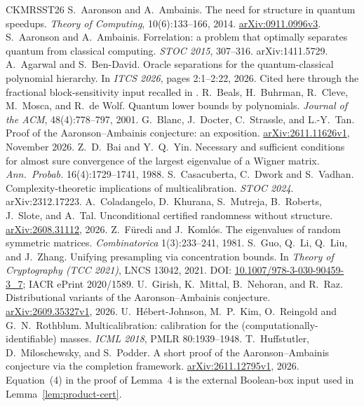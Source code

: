 \documentclass[11pt]{article}
\theoremstyle{definition}\newtheorem{definition}[theorem]{Definition}
\theoremstyle{remark}\newtheorem{remark}[theorem]{Remark}
\begin{document}
\begin{thebibliography}{CKMRSST26}
 S.~Aaronson and A.~Ambainis. The need for structure in quantum speedups. \emph{Theory of Computing}, 10(6):133--166, 2014. \href{https://arxiv.org/abs/0911.0996v3}{arXiv:0911.0996v3}.
 S.~Aaronson and A.~Ambainis. Forrelation: a problem that optimally separates quantum from classical computing. \emph{STOC 2015}, 307--316. arXiv:1411.5729.
 A.~Agarwal and S.~Ben-David. Oracle separations for the quantum-classical polynomial hierarchy. In \emph{ITCS 2026}, pages 2:1--2:22, 2026. Cited here through the fractional block-sensitivity input recalled in \cite[Fact~2.4]{BDST26}.
 R.~Beals, H.~Buhrman, R.~Cleve, M.~Mosca, and R.~de Wolf. Quantum lower bounds by polynomials. \emph{Journal of the ACM}, 48(4):778--797, 2001.
 G.~Blanc, J.~Docter, C.~Strassle, and L.-Y.~Tan. Proof of the Aaronson--Ambainis conjecture: an exposition. \href{https://arxiv.org/abs/2611.11626v1}{arXiv:2611.11626v1}, November 2026.
 Z.~D.~Bai and Y.~Q.~Yin. Necessary and sufficient conditions for almost sure convergence of the largest eigenvalue of a Wigner matrix. \emph{Ann.\ Probab.} 16(4):1729--1741, 1988.
 S.~Casacuberta, C.~Dwork and S.~Vadhan. Complexity-theoretic implications of multicalibration. \emph{STOC 2024}. arXiv:2312.17223.
 A.~Coladangelo, D.~Khurana, S.~Mutreja, B.~Roberts, J.~Slote, and A.~Tal. Unconditional certified randomness without structure. \href{https://arxiv.org/abs/2608.31112}{arXiv:2608.31112}, 2026.
 Z.~Füredi and J.~Komlós. The eigenvalues of random symmetric matrices. \emph{Combinatorica} 1(3):233--241, 1981.
 S.~Guo, Q.~Li, Q.~Liu, and J.~Zhang. Unifying presampling via concentration bounds. In \emph{Theory of Cryptography (TCC 2021)}, LNCS 13042, 2021. DOI: \href{https://doi.org/10.1007/978-3-030-90459-3_7}{10.1007/978-3-030-90459-3\_7}; IACR ePrint 2020/1589.
 U.~Girish, K.~Mittal, B.~Nehoran, and R.~Raz. Distributional variants of the Aaronson--Ambainis conjecture. \href{https://arxiv.org/abs/2609.35327v1}{arXiv:2609.35327v1}, 2026.
 U.~Hébert-Johnson, M.~P.~Kim, O.~Reingold and G.~N.~Rothblum. Multicalibration: calibration for the (computationally-identifiable) masses. \emph{ICML 2018}, PMLR 80:1939--1948.
 T.~Huffstutler, D.~Miloschewsky, and S.~Podder. A short proof of the Aaronson--Ambainis conjecture via the completion framework. \href{https://arxiv.org/abs/2611.12795v1}{arXiv:2611.12795v1}, 2026. Equation~(4) in the proof of Lemma~4 is the external Boolean-box input used in Lemma~\ref{lem:product-cert}.

\end{thebibliography}
\end{document}
